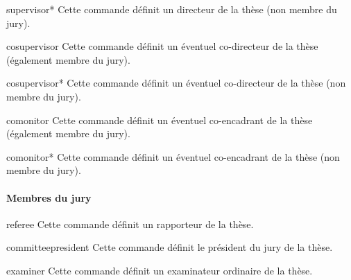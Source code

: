 \begin{docCommand}[doc description=\mandatory]{supervisor*}{}
  Cette commande définit un directeur de la thèse (non membre du jury).
\end{docCommand}

\begin{docCommand}{cosupervisor}{}
  Cette commande définit un éventuel co-directeur de la thèse (également membre du jury).
\end{docCommand}

\begin{docCommand}{cosupervisor*}{}
  Cette commande définit un éventuel co-directeur de la thèse (non membre du jury).
\end{docCommand}

\begin{docCommand}{comonitor}{}
  Cette commande définit un éventuel co-encadrant de la thèse (également membre du jury).
\end{docCommand}

\begin{docCommand}{comonitor*}{}
  Cette commande définit un éventuel co-encadrant de la thèse (non membre du jury).
\end{docCommand}

\paragraph{Membres du jury}\label{sec:definition-jury}

\begin{docCommand}{referee}{}
  Cette commande définit un rapporteur de la thèse.
\end{docCommand}

\begin{docCommand}{committeepresident}{}
  Cette commande définit le président du jury de la thèse.
\end{docCommand}

\begin{docCommand}{examiner}{}
  Cette commande définit un examinateur ordinaire de la thèse.
\end{docCommand}

